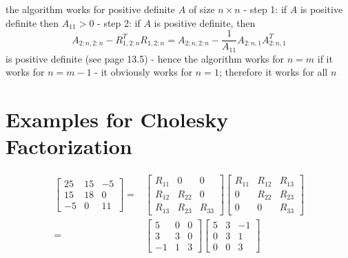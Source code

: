 the algorithm works for positive definite $ A $ of size $ n \times n $
- step 1: if $ A $ is positive definite then $ A_{11}>0 $
- step 2: if $ A $ is positive definite, then
$$
A_{2: n, 2: n}-R_{1,2: n}^{T} R_{1,2: n}=A_{2: n, 2: n}-\frac{1}{A_{11}} A_{2: n, 1} A_{2: n, 1}^{T}
$$
is positive definite (see page 13.5)
- hence the algorithm works for $ n=m $ if it works for $ n=m-1 $
- it obviously works for $ n=1 $; therefore it works for all $ n $

\section{Examples for Cholesky Factorization}

\begin{example}
    $$ \begin{aligned}\left[\begin{array}{rrr}25 & 15 & -5 \\ 15 & 18 & 0 \\ -5 & 0 & 11\end{array}\right]=&\left[\begin{array}{ccc}R_{11} & 0 & 0 \\ R_{12} & R_{22} & 0 \\ R_{13} & R_{23} & R_{33}\end{array}\right]\left[\begin{array}{ccc}R_{11} & R_{12} & R_{13} \\ 0 & R_{22} & R_{23} \\ 0 & 0 & R_{33}\end{array}\right] \\=&\left[\begin{array}{rrr}5 & 0 & 0 \\ 3 & 3 & 0 \\ -1 & 1 & 3\end{array}\right]\left[\begin{array}{rrr}5 & 3 & -1 \\ 0 & 3 & 1 \\ 0 & 0 & 3\end{array}\right] \end{aligned} $$


\end{example}
